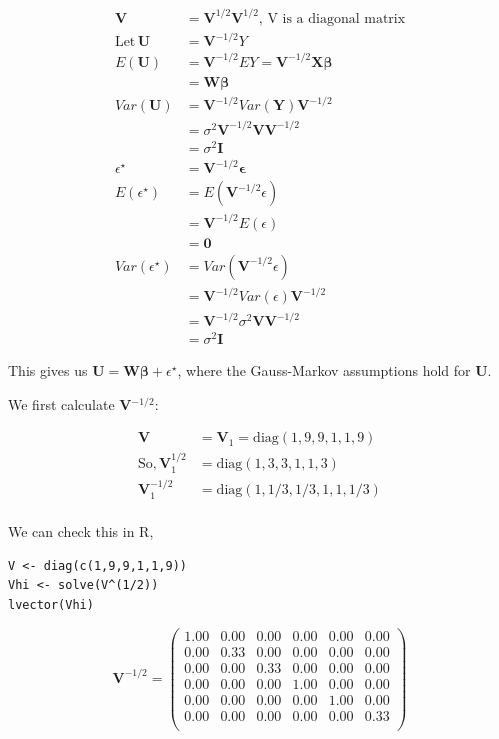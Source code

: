 \documentclass[11pt]{article}
\begin{document}
\begin{align*}
\mathbf{V} &= \mathbf{V}^{1/2} \mathbf{V}^{1/2},\, \text{V is a
diagonal matrix}\\
\mathrm{Let }\, \mathbf{U}& =\mathbf{V}^{-1/2}Y\\ E(\mathbf{U}) &= \mathbf{V}^{-1/2}E{Y} = \mathbf{V}^{-1/2}\mathbf{X\beta}\\
&= \mathbf{W\beta}\\
Var(\mathbf{U}) &= \mathbf{V}^{-1/2} Var(\mathbf{Y})\mathbf{V}^{-1/2}\\
                &= \sigma^2 \mathbf{V}^{-1/2} \mathbf{V}\mathbf{V}^{-1/2}\\
                &= \sigma^2 \mathbf{I}\\
\epsilon^{\star} &= \mathbf{V}^{-1/2} \mathbf{\epsilon}\\
E(\epsilon^{\star}) &= E(\mathbf{V}^{-1/2}\epsilon) \\
                    &= \mathbf{V}^{-1/2}E(\epsilon) \\
                    &= \mathbf{0}\\
Var(\epsilon^{\star}) &= Var(\mathbf{V}^{-1/2}\epsilon) \\
                      &= \mathbf{V}^{-1/2} Var(\epsilon) \mathbf{V}^{-1/2}\\
                      &= \mathbf{V}^{-1/2} \sigma^2 \mathbf{V} \mathbf{V}^{-1/2}\\
                      &= \sigma^2 \mathbf{I}
\end{align*}

This gives us $\mathbf{U} = \mathbf{W\beta} + \epsilon^{\star}$, where
the Gauss-Markov assumptions hold for \textbf{U}.

We first calculate \textbf{V$^{\mathrm{-1/2}}$}:

\begin{align*}
\mathbf{V} &= \mathbf{V}_1 = \mathrm{diag}(1,9,9,1,1,9)\\
\text{So,}\, \mathbf{V}^{1/2}_1 &= \mathrm{diag}(1,3,3,1,1,3)\\
             \mathbf{V}^{-1/2}_1 &= \mathrm{diag}(1,1/3,1/3,1,1,1/3)\\
\end{align*}

We can check this in R,

\begin{verbatim}
V <- diag(c(1,9,9,1,1,9))
Vhi <- solve(V^(1/2))
lvector(Vhi)
\end{verbatim}

\[
\mathbf{V}^{-1/2} = 
\begin{pmatrix}{}
  1.00 & 0.00 & 0.00 & 0.00 & 0.00 & 0.00 \\ 
  0.00 & 0.33 & 0.00 & 0.00 & 0.00 & 0.00 \\ 
  0.00 & 0.00 & 0.33 & 0.00 & 0.00 & 0.00 \\ 
  0.00 & 0.00 & 0.00 & 1.00 & 0.00 & 0.00 \\ 
  0.00 & 0.00 & 0.00 & 0.00 & 1.00 & 0.00 \\ 
  0.00 & 0.00 & 0.00 & 0.00 & 0.00 & 0.33 \\ 
  \end{pmatrix}
\]
\end{document}
